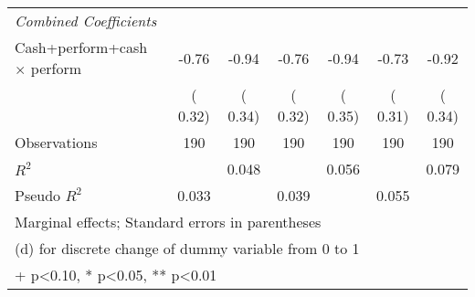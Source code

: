 {\begin{tabular}{l*{6}{c}}
\midrule
\multicolumn{7}{l}{\textit{Combined Coefficients}}\\
Cash+perform+cash $\times$ perform &     -0.76 &     -0.94 &     -0.76 &    -0.94 &     -0.73&     -0.92 \\
 &  (     0.32)&  (     0.34)&  (     0.32)&  (     0.35)&  (     0.31)&(     0.34)\\
\bottomrule
Observations    &      190  &      190  &      190  &      190  &      190  &      190  \\
\(R^{2}\)       &           &    0.048  &           &    0.056  &           &    0.079  \\
Pseudo \(R^{2}\)&    0.033  &           &    0.039  &           &    0.055  &           \\
\bottomrule
\multicolumn{7}{l}{\footnotesize Marginal effects; Standard errors in parentheses}\\
\multicolumn{7}{l}{\footnotesize  (d) for discrete change of dummy variable from 0 to 1}\\
\multicolumn{7}{l}{\footnotesize + p<0.10, * p<0.05, ** p<0.01}\\
\end{tabular}
}
